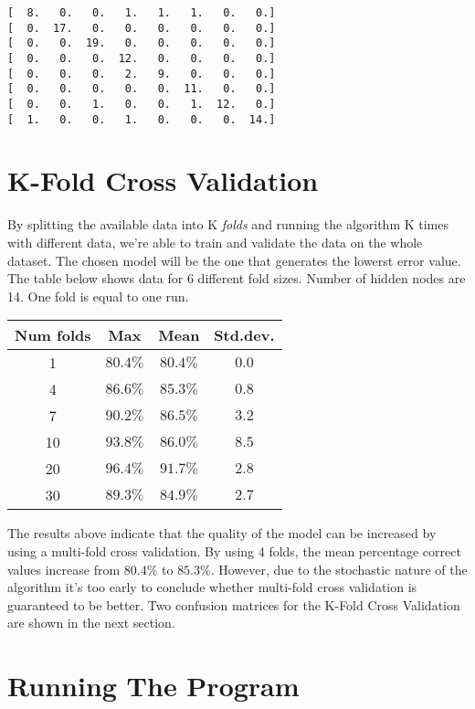 \documentclass{article}
\begin{document}
\begin{center}
\begin{verbatim}
[  8.   0.   0.   1.   1.   1.   0.   0.]
[  0.  17.   0.   0.   0.   0.   0.   0.]
[  0.   0.  19.   0.   0.   0.   0.   0.]
[  0.   0.   0.  12.   0.   0.   0.   0.]
[  0.   0.   0.   2.   9.   0.   0.   0.]
[  0.   0.   0.   0.   0.  11.   0.   0.]
[  0.   0.   1.   0.   0.   1.  12.   0.]
[  1.   0.   0.   1.   0.   0.   0.  14.]
\end{verbatim}
\end{center}

\section*{K-Fold Cross Validation}

By splitting the available data into K \emph{folds} and running the algorithm K times with different data, we're able to train and validate the data on the whole dataset. The chosen model will be the one that generates the lowerst error value. The table below shows data for 6 different fold sizes. Number of hidden nodes are 14. One fold is equal to one run.

\begin{center}
\begin{tabular}{cccc}
\toprule
Num folds & Max & Mean & Std.dev. \\
\midrule
1 & $80.4\%$ & $80.4\%$ & $0.0$\\
4 & $86.6\%$ & $85.3\%$ & $0.8$\\
7 & $90.2\%$ & $86.5\%$ & $3.2$\\
10 & $93.8\%$ & $86.0\%$ & $8.5$\\
20 & $96.4\%$ & $91.7\%$ & $2.8$\\
30 & $89.3\%$ & $84.9\%$ & $2.7$\\
\bottomrule
\end{tabular}
\end{center}

\noindent The results above indicate that the quality of the model can be increased by using a multi-fold cross validation. By using 4 folds, the mean percentage correct values increase from $80.4\%$ to $85.3\%$. However, due to the stochastic nature of the algorithm it's too early to conclude whether multi-fold cross validation is guaranteed to be better. Two confusion matrices for the K-Fold Cross Validation are shown in the next section.

\section*{Running The Program}
\end{document}
